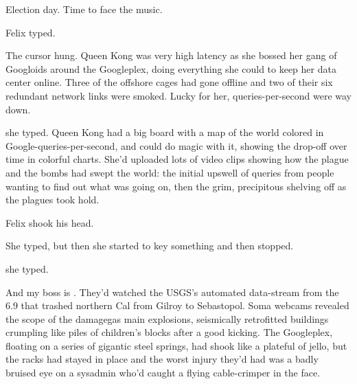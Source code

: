 Election day. Time to face the music.

Felix typed.

The cursor hung. Queen Kong was very high latency as she bossed her
gang of Googloids around the Googleplex, doing everything she could
to keep her data center online. Three of the offshore cages had
gone offline and two of their six redundant network links were
smoked. Lucky for her, queries-per-second were way down.

she typed. Queen Kong had a big board with a map of the world
colored in Google-queries-per-second, and could do magic with it,
showing the drop-off over time in colorful charts. She’d uploaded
lots of video clips showing how the plague and the bombs had swept
the world: the initial upswell of queries from people wanting to
find out what was going on, then the grim, precipitous shelving off
as the plagues took hold.

Felix shook his head.

She typed, but then she started to key something and then stopped.

she typed.

And my boss is
.
They’d watched the USGS’s automated data-stream from the 6.9 that
trashed northern Cal from Gilroy to Sebastopol. Soma webcams
revealed the scope of the damage\dash{}gas main explosions, seismically
retrofitted buildings crumpling like piles of children’s blocks
after a good kicking. The Googleplex, floating on a series of
gigantic steel springs, had shook like a plateful of jello, but the
racks had stayed in place and the worst injury they’d had was a
badly bruised eye on a sysadmin who’d caught a flying cable-crimper
in the face.


